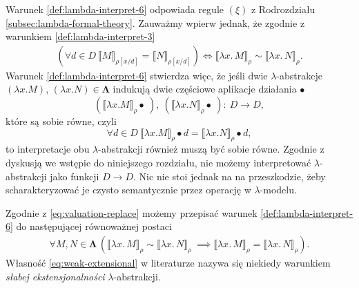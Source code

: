 Warunek \ref{def:lambda-interpret-6} odpowiada regule \((\xi)\) z Rodrozdziału \ref{subsec:lambda-formal-theory}.
Zauważmy wpierw jednak, że zgodnie z warunkiem \ref{def:lambda-interpret-3}
\begin{align*}
  (\forall d\in D\ \llbracket M \rrbracket_{\rho[x/d]}=\llbracket N \rrbracket_{\rho[x/d]})
\iff
\llbracket\lambda x.\,M\rrbracket_\rho \sim \llbracket \lambda x.\,N\rrbracket_\rho.
\tag{\dagger\dagger}\label{eq:valuation-replace}
\end{align*}
Warunek \ref{def:lambda-interpret-6} stwierdza więc, że jeśli dwie \(\lambda\)-abstrakcje 
\((\lambda x. M)\), \((\lambda x. N)\in\mathbf{\Lambda}\) indukują dwie częściowe aplikacje działania \(\bullet\)
\[(\llbracket \lambda x. M \rrbracket_\rho\bullet\ ),\ (\llbracket \lambda x. N \rrbracket_\rho\bullet\ ):\: D\to D,\]
które są sobie równe, czyli
\[
\forall d\in D\ \llbracket \lambda x. M \rrbracket_\rho\bullet d = \llbracket \lambda x. N \rrbracket_\rho\bullet d,
\]
to interpretacje obu \(\lambda\)-abstrakcji również muszą być sobie równe. Zgodnie z dyskusją we wstępie do niniejszego rozdziału,
nie możemy interpretować \(\lambda\)-abstrakcji jako funkcji \(D\to D\). Nic nie stoi jednak na na przeszkodzie, żeby scharakteryzować je  
czysto semantycznie przez operację w \(\lambda\)-modelu.




Zgodnie z \eqref{eq:valuation-replace} możemy przepisać warunek \ref{def:lambda-interpret-6} do następującej równoważnej postaci
  \begin{align}
    \forall M,N\in\mathbf{\Lambda}\,\left(\llbracket\lambda x.\,M\rrbracket_\rho \sim \llbracket \lambda x.\,N\rrbracket_\rho\ \implies \llbracket \lambda x.\,M\rrbracket_\rho = \llbracket \lambda x.\,N\rrbracket_\rho\right).\tag{vi'}\label{eq:weak-extensional}
    \end{align}  
Własność \eqref{eq:weak-extensional} w literaturze nazywa się niekiedy warunkiem \emph{słabej ekstensjonalności} \(\lambda\)-abstrakcji.

